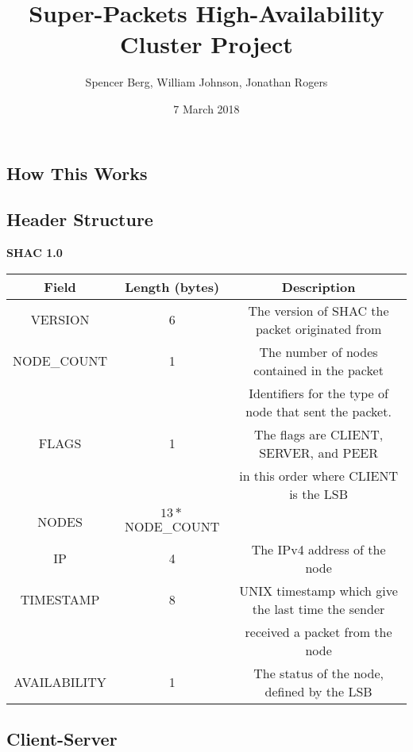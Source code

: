\documentclass[11pt]{article}
\title{Super-Packets High-Availability Cluster Project}
\author{Spencer Berg, William Johnson, Jonathan Rogers}
\date{7 March 2018}
\begin{document}
\maketitle

\thispagestyle{empty}

\begin{doublespace}
\section{How This Works}

\subsection{Header Structure}
\begin{center}
\textbf{SHAC 1.0}
\begin{tabular}{|c|c|c|}
\hline
Field & Length (bytes) & Description \\
\hline
VERSION & 6 & The version of SHAC the packet originated from \\
\hline
NODE\_COUNT & 1 & The number of nodes contained in the packet \\
\hline
 &  & Identifiers for the type of node that sent the packet.\\
FLAGS & 1 & The flags are CLIENT, SERVER, and PEER \\ 
 & & in this order where CLIENT is the LSB \\
\hline
NODES & $13*$NODE\_COUNT& \\
\hdashline
IP & 4 & The IPv4 address of the node \\
\hdashline
TIMESTAMP & 8 & UNIX timestamp which give the last time the sender\\
& & received a packet from the node \\
\hdashline
AVAILABILITY & 1 & The status of the node, defined by the LSB \\
\hline
\end{tabular}
\end{center}

\subsection{Client-Server}


\end{doublespace}
\end{document}
